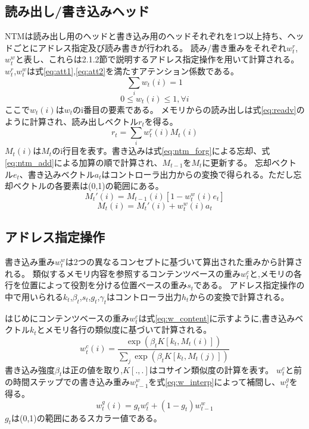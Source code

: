 \subsection{読み出し/書き込みヘッド}
NTMは読み出し用のヘッドと書き込み用のヘッドそれぞれを1つ以上持ち、ヘッドごとにアドレス指定及び読み書きが行われる。
読み/書き重みをそれぞれ$w^r_t$,$w^w_t$と表し、これらは2.1.2節で説明するアドレス指定操作を用いて計算される。
$w^r_t$,$w^w_t$は式\ref{eq:att1},\ref{eq:att2}を満たすアテンション係数である。
\begin{equation} \label{eq:att1}
	\sum_{i}w_t(i) = 1
\end{equation}
\begin{equation} \label{eq:att2}
	0\leq w_t(i)\leq 1 , \forall i
\end{equation}
ここで$w_t(i)$は$w_t$のi番目の要素である。
メモリからの読み出しは式\ref{eq:readv}のように計算され、読み出しベクトル$r_t$を得る。
\begin{equation}\label{eq:readv}
	r_t = \sum_{i}w^r_t(i)M_t(i)
\end{equation}
$M_t(i)$は$M_t$のi行目を表す。書き込みは式\ref{eq:ntm_forg}による忘却、式\ref{eq:ntm_add}による加算の順で計算され、$M_{t-1}$を$M_t$に更新する。
忘却ベクトル$e_t$、書き込みベクトル$a_t$はコントローラ出力からの変換で得られる。ただし忘却ベクトルの各要素は(0,1)の範囲にある。
\begin{equation} \label{eq:ntm_forg}
	M_t'(i) = M_{t-1}(i)[1-w^w_t(i)e_t]
\end{equation}
\begin{equation} \label{eq:ntm_add}
	M_t(i) = M_t'(i) + w^w_t(i)a_t
\end{equation}

\subsection{アドレス指定操作}
書き込み重み$w^w_t$は2つの異なるコンセプトに基づいて算出された重みから計算される。
類似するメモリ内容を参照するコンテンツベースの重み$w^c_t$と,メモリの各行を位置によって役割を分ける位置ベースの重み$s_t$である。
アドレス指定操作の中で用いられる$k_t$,$\beta_t$,$s_t$,$g_t$,$\gamma_t$はコントローラ出力$h_t$からの変換で計算される。

はじめにコンテンツベースの重み$w^c_t$は式\ref{eq:w_content}に示すように,書き込みベクトル$k_t$とメモリ各行の類似度に基づいて計算される。
\begin{equation} \label{eq:w_content}
	w^c_t(i) =\frac{\exp(\beta_tK\left[k_t,M_t(i)\right] ) }{\sum_j\exp(\beta_tK\left[k_t,M_t(j)\right] )}  
\end{equation}
書き込み強度$\beta_t$は正の値を取り,$K[.,.]$はコサイン類似度の計算を表す。
$w^c_t$と前の時間ステップでの書き込み重み$w^w_{t-1}$を式\ref{eq:w_interp}によって補間し、$w^g_t$を得る。
\begin{equation} \label{eq:w_interp}
	w^g_t(i) = g_t w^c_t+(1-g_t)w^w_{t-1}
\end{equation}
$g_t$は(0,1)の範囲にあるスカラー値である。

